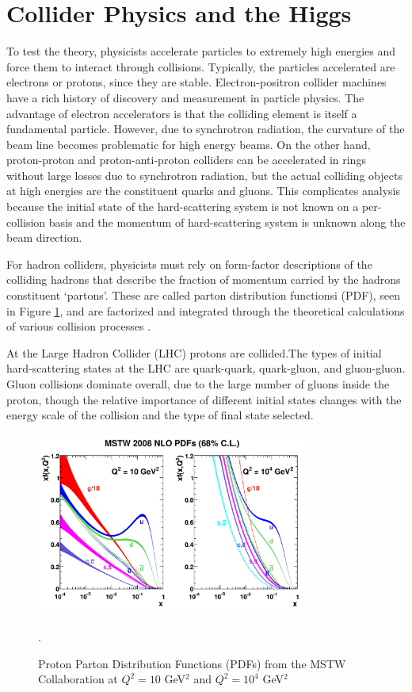 \section{Collider Physics and the Higgs} 

To test the theory, physicists accelerate particles to extremely high energies and force
them to interact through collisions. Typically, the particles accelerated are
electrons or protons, since they are stable. Electron-positron collider
machines have a rich history of discovery and measurement in particle physics.
The advantage of electron accelerators is that the colliding element is itself
a fundamental particle. However, due to synchrotron radiation, the curvature of the
beam line becomes problematic for high energy beams.  On the other
hand, proton-proton and proton-anti-proton colliders can be accelerated in rings without large losses
due to synchrotron radiation, but the actual colliding objects at high
energies are the constituent quarks and gluons. This complicates analysis
because the initial state of the hard-scattering system is not known on a per-collision
basis and the momentum of hard-scattering system is unknown along the beam direction.

For hadron colliders, physicists must rely on form-factor descriptions of the colliding hadrons
that describe the fraction of momentum carried by the
hadrons constituent `partons'.  These are called parton distribution
functionsi (PDF), seen in Figure \ref{figure:theory_pdf}, and are factorized
and integrated through the theoretical calculations of various collision processes \cite{1985.Collins.factorization-theorem}.

At the Large Hadron Collider (LHC) protons are collided.The types of initial hard-scattering states at the LHC are quark-quark, quark-gluon, and gluon-gluon. Gluon collisions dominate overall,
  due to the large number of gluons inside the proton, though the relative importance of different initial states changes with the
  energy scale of the collision and the type of final state selected.  

\begin{figure}[!t]
\centering 
\includegraphics[width=0.8\textwidth]{figs/theory/mstw2008nlo68cl_allpdfs.pdf}
\caption {Proton Parton Distribution Functions (PDFs) from the MSTW Collaboration at $Q^2 = 10$ GeV$^2$ and $Q^2 = 10^4$ GeV$^2$}.
\label{figure:theory_pdf}
\end{figure}

